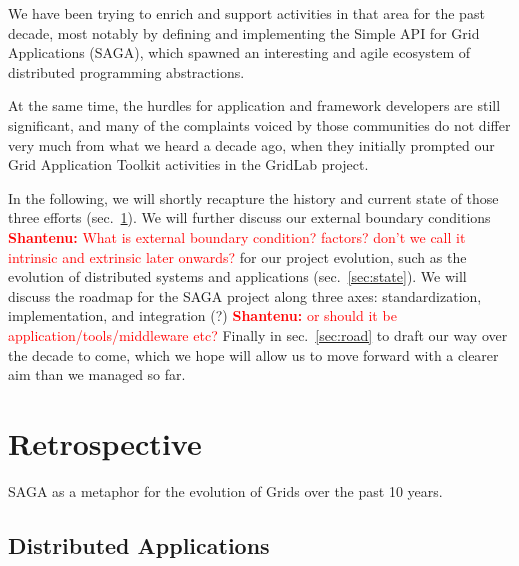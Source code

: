 \documentclass{article}
\newcommand{\B}[1]{\textbf{#1}}
\newcommand{\jhanote}[1]{{\textcolor{red}{     \B{Shantenu:} #1 }}}
\newcommand{\jhanote}[1]{}
\begin{document}
We have been trying to enrich and support activities in that area for
the past decade, most notably by defining and implementing the Simple
API for Grid Applications (SAGA), which spawned an interesting and
agile ecosystem of distributed programming abstractions.
 
At the same time, the hurdles for application and framework
developers are still significant, and many of
the complaints voiced by those communities do not differ very much
from what we heard a decade ago, when they initially prompted our Grid
Application Toolkit activities in the GridLab project.


 
In the following, we will shortly recapture the history and current
state of those three efforts (sec.~\ref{sec:retro}).  We will further
discuss our external boundary conditions \jhanote{What is external
  boundary condition? factors? don't we call it intrinsic and
  extrinsic later onwards?} for our project evolution, such as the
evolution of distributed systems and applications
(sec.~\ref{sec:state}).  We will discuss the roadmap for the SAGA
project along three axes: standardization, implementation, and
integration (?) \jhanote{ or should it be application/tools/middleware
  etc?}  Finally in sec.~\ref{sec:road} to draft our way over the
decade to come, which we hope will allow us to move forward with a
clearer aim than we managed so far.







\section{Retrospective}
\label{sec:retro}


SAGA as a metaphor for the evolution of Grids over the past 10 years.

 \subsection{Distributed Applications}
\end{document}
